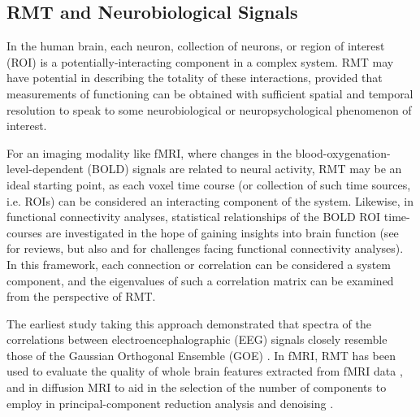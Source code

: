\documentclass[12pt]{spieman}  %
\begin{document}
\begin{spacing}{2}
\subsection{RMT and Neurobiological Signals}

In the human brain, each neuron, collection of neurons, or region of interest
(ROI) is a potentially-interacting component in a complex system. RMT
may have potential in describing the totality of these interactions, provided
that measurements of functioning can be obtained with sufficient spatial and
temporal resolution to speak to some neurobiological or neuropsychological
phenomenon of interest.

For an imaging modality like fMRI, where changes in the
blood-oxygenation-level-dependent (BOLD) signals are related to neural
activity, RMT may be an ideal starting point, as each voxel time course (or
collection of such time sources, i.e. ROIs) can be considered an interacting
component of the system. Likewise, in functional connectivity
analyses, statistical relationships of the BOLD ROI time-courses are
investigated in the hope of gaining insights into brain function (see
 for reviews, but also
 and
 for challenges facing functional
connectivity analyses). In this framework, each connection or correlation can
be considered a system component, and the eigenvalues of such a correlation
matrix can be examined from the perspective of RMT.

The earliest study taking this approach demonstrated that spectra of the
correlations between electroencephalographic (EEG) signals closely resemble
those of the Gaussian Orthogonal Ensemble (GOE)
\cite{sebaRandomMatrixAnalysis2003}. In fMRI, RMT has been used to evaluate the
quality of whole brain features extracted from fMRI data
\cite{voultsidouFeatureEvaluationFMRI2007, verganiRestingStateFMRI2019}, and in
diffusion MRI to aid in the selection of the number of components to employ in
principal-component reduction analysis and denoising
\cite{veraartDenoisingDiffusionMRI2016, verganiRestingStateFMRI2019,
ulfarssonDimensionEstimationNoisy2008}.


\end{spacing}
\end{document}
